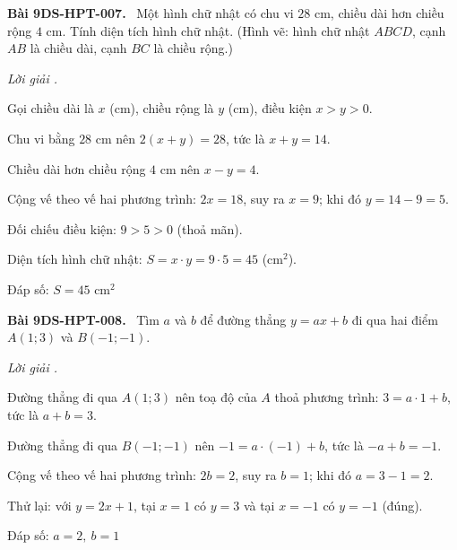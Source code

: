 \documentclass[12pt,a4paper]{article}
\newenvironment{problem}[1][]{\par\medskip\noindent\textbf{Bài #1.}\ }{\par}
\newenvironment{solution}[1][]{\par\noindent\textit{Lời giải #1.}\par}{\par}
\begin{document}
\begin{problem}[9DS-HPT-007]
Một hình chữ nhật có chu vi $28$ cm, chiều dài hơn chiều rộng $4$ cm. Tính diện tích hình chữ nhật.
(Hình vẽ: hình chữ nhật $ABCD$, cạnh $AB$ là chiều dài, cạnh $BC$ là chiều rộng.)

\begin{solution}
Gọi chiều dài là $x$ (cm), chiều rộng là $y$ (cm), điều kiện $x > y > 0$.

Chu vi bằng $28$ cm nên $2(x + y) = 28$, tức là $x + y = 14$.

Chiều dài hơn chiều rộng $4$ cm nên $x - y = 4$.

Cộng vế theo vế hai phương trình: $2x = 18$, suy ra $x = 9$; khi đó $y = 14 - 9 = 5$.

Đối chiếu điều kiện: $9 > 5 > 0$ (thoả mãn).

Diện tích hình chữ nhật: $S = x \cdot y = 9 \cdot 5 = 45$ (cm$^2$).

Đáp số: $\boxed{S = 45 \text{ cm}^2}$
\end{solution}
\end{problem}

\begin{problem}[9DS-HPT-008]
Tìm $a$ và $b$ để đường thẳng $y = ax + b$ đi qua hai điểm $A(1; 3)$ và $B(-1; -1)$.

\begin{solution}
Đường thẳng đi qua $A(1; 3)$ nên toạ độ của $A$ thoả phương trình: $3 = a \cdot 1 + b$, tức là $a + b = 3$.

Đường thẳng đi qua $B(-1; -1)$ nên $-1 = a \cdot (-1) + b$, tức là $-a + b = -1$.

Cộng vế theo vế hai phương trình: $2b = 2$, suy ra $b = 1$; khi đó $a = 3 - 1 = 2$.

Thử lại: với $y = 2x + 1$, tại $x = 1$ có $y = 3$ và tại $x = -1$ có $y = -1$ (đúng).

Đáp số: $\boxed{a = 2,\ b = 1}$
\end{solution}
\end{problem}
\end{document}
